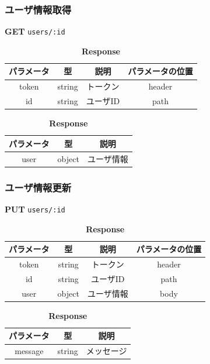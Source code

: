 \subsubsection*{ユーザ情報取得}
\textbf{GET} \texttt{users/:id}
\begin{table}[H]
  \begin{minipage}
    {0.5\hsize} \centering
    \captionsetup{labelformat=empty,labelsep=none}
    \caption{\textbf{Request}}
    \begin{tabular}{|c|c|c|c|} \hline
      パラメータ & 型      & 説明    & パラメータの位置 \\ \hline \hline
      token & string & トークン  & header   \\ \hline
      id    & string & ユーザID & path     \\ \hline
    \end{tabular}
  \end{minipage}
  \begin{minipage}
    {0.5\hsize} \centering
    \captionsetup{labelformat=empty,labelsep=none}
    \caption{\textbf{Response}}
    \begin{tabular}{|c|c|c|} \hline
      パラメータ & 型      & 説明    \\ \hline \hline
      user  & object & ユーザ情報 \\ \hline
    \end{tabular}
  \end{minipage}
\end{table}

\subsubsection*{ユーザ情報更新}
\textbf{PUT} \texttt{users/:id}
\begin{table}[H]
  \begin{minipage}
    {0.5\hsize} \centering
    \captionsetup{labelformat=empty,labelsep=none}
    \caption{\textbf{Request}}
    \begin{tabular}{|c|c|c|c|} \hline
      パラメータ & 型      & 説明    & パラメータの位置 \\ \hline \hline
      token & string & トークン  & header   \\ \hline
      id    & string & ユーザID & path     \\ \hline
      user  & object & ユーザ情報 & body     \\ \hline
    \end{tabular}
  \end{minipage}
  \begin{minipage}
    {0.5\hsize} \centering
    \captionsetup{labelformat=empty,labelsep=none}
    \caption{\textbf{Response}}
    \begin{tabular}{|c|c|c|} \hline
      パラメータ   & 型      & 説明    \\ \hline \hline
      message & string & メッセージ \\ \hline
    \end{tabular}
  \end{minipage}
\end{table}
\hrulefill

